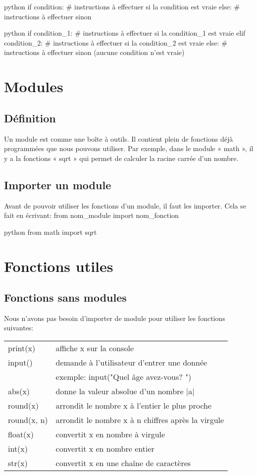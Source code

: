 \documentclass[a4paper,11pt]{article}
\begin{document}
\begin{code}{python}
if condition:
  # instructions à effectuer si la condition est vraie
else:
  # instructions à effectuer sinon
\end{code}

\begin{code}{python}
if condition_1:
  # instructions à effectuer si la condition_1 est vraie
elif condition_2:
  # instructions à effectuer si la condition_2 est vraie
else:
  # instructions à effectuer sinon (aucune condition n'est vraie)
\end{code}

\section{Modules}

\subsection{Définition}
Un module est comme une boîte à outils. Il contient plein de fonctions déjà programmées que nous pouvons utiliser.
Par exemple, dans le module « math », il y a la fonctions « sqrt » qui permet de calculer la racine carrée d’un nombre.

\subsection{Importer un module}
Avant de pouvoir utiliser les fonctions d’un module, il faut les importer.
Cela se fait en écrivant: from nom\_module import nom\_fonction
\begin{code}{python}
from math import sqrt
\end{code}

\section{Fonctions utiles}
\subsection{Fonctions sans modules}
Nous n'avons pas besoin d'importer de module pour utiliser les fonctions suivantes:\par
\begin{tabular}{l l}
print(x) & affiche x sur la console\\
input() & demande à l'utilisateur d'entrer une donnée\\
  & exemple: input("Quel âge avez-vous? ")\\
abs(x) & donne la valeur absolue d'un nombre |a| \\
round(x) & arrondit le nombre x à l'entier le plus proche\\
round(x, n) & arrondit le nombre x à n chiffres après la virgule\\
float(x) & convertit x en nombre à virgule\\
int(x) & convertit x en nombre entier\\
str(x) & convertit x en une chaîne de caractères\\
\end{tabular}
\end{document}
